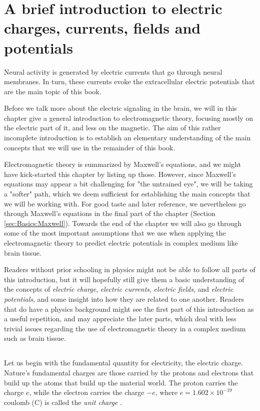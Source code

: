 \chapter{A brief introduction to electric charges, currents, fields and potentials}
\label{chap:Basics}

Neural activity is generated by electric currents that go through neural membranes. In turn, these currents
evoke the extracellular electric potentials that are the main topic of this book.

Before we talk more about the electric signaling in the brain, we will in this chapter give a general introduction to electromagnetic theory, focusing mostly on the electric part of it, and less on the magnetic. The aim of this rather incomplete introduction is to establish an elementary understanding of the main concepts that we will use in the remainder of this book.

Electromagnetic theory is summarized by Maxwell's equations, and we might have kick-started this chapter by listing up those. However, since Maxwell's equations may appear a bit challenging for "the untrained eye", we will be taking a "softer" path, which we deem sufficient for establishing the main concepts that we will be working with. For good taste and later reference, we nevertheless go through Maxwell's equations in the final part of the chapter (Section \ref{sec:Basics:Maxwell}). Towards the end of the chapter we will also go through some of the most important assumptions that we use when applying the electromagnetic theory to predict electric potentials in complex medium like brain tissue.

Readers without prior schooling in physics might not be able to follow all parts of this introduction, but it will hopefully still give them a basic understanding of the concepts of \textit{electric charge}, \textit{electric currents}, \textit{electric fields}, and \textit{electric potentials}, and some insight into how they are related to one another. Readers that do have a physics background might see the first part of this introduction as a useful repetition, and may appreciate the later parts, which deal with less trivial issues regarding the use of electromagnetic theory in a complex medium such as brain tissue.


\section{}
\label{sec:Basics:Charge} 
Let us begin with the fundamental quantity for electricity, the electric charge. Nature's fundamental charges are those carried by the protons and electrons that build up the atoms that build up the material world. The proton carries the charge $e$, while the electron carries the charge $-e$, where $e = 1.602\times10^{-19}$ coulomb (\si{\coulomb}) is called the \textit{unit charge} .

